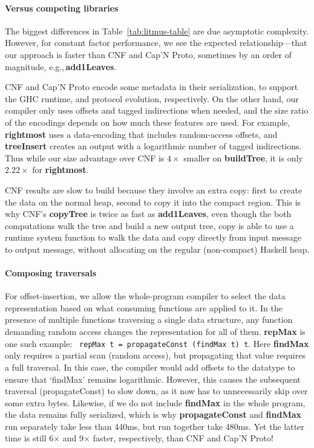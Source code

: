 \documentclass[showabstract,showacknowledgments,showpreface,showdedication,school]{iuphd}
\theoremstyle{nonumberplain}
\newcommand{\eg}{{e.g.,}}
\newcommand{\tabref}[1]{Table~\ref{#1}}
\newcommand{\il}[1]{\lstinline[style=inline,mathescape=true];#1;}
\begin{document}
\paragraph{Versus competing libraries}


The biggest differences in \tabref{tab:litmus-table} are due
asymptotic complexity.
However, for constant factor performance, we see the expected
relationship---that our approach is faster than CNF and Cap'N Proto,
sometimes by an order of magnitude, \eg\,{\bf add1Leaves}.

CNF and Cap'N Proto encode some metadata in their serialization, to
support the GHC runtime, and protocol evolution, respectively.
On the other hand,
our compiler only uses offsets and tagged indirections
when needed, and the size ratio of the encodings depends on how much these features are used.
For example, {\bf rightmost} uses a data-encoding that includes random-access
offsets, and {\bf treeInsert} creates an output with a logarithmic number of
tagged indirections.  Thus while our size advantage over CNF is
$4\times$ smaller
on {\bf buildTree}, it is only
$2.22\times$
for {\bf rightmost}.

CNF results are slow to build because they involve an extra copy: first to
create the data on the normal heap, second to copy it into the compact region.
This is why CNF's {\bf copyTree} is twice as fast as {\bf add1Leaves}, even
though the both computations walk the tree and build a new output tree, copy is
able to use a runtime system function to walk the data and copy directly from
input message to output message, without allocating on the regular (non-compact)
Haskell heap.

\paragraph{Composing traversals}

For offset-insertion, we allow the whole-program compiler to select the data
representation based on what consuming functions are applied to it.
In the presence of multiple functions traversing a single data structure,
any function demanding random access changes the representation for all of them.
{\bf repMax} is one such example:
\il{ repMax t = propagateConst (findMax t) t}.
Here {\bf findMax} only requires a partial scan (random access), but propagating
that value requires a full traversal.  In this case, the compiler would add
offsets to the datatype to ensure that `findMax' remains
logarithmic.
However, this causes the subsequent traversal (propagateConst) to slow
down, as it now has to unnecessarily skip over some extra bytes.  Likewise, if
we do not include {\bf findMax} in the whole program, the data remains fully
serialized, which is why {\bf propagateConst} and {\bf findMax} run separately
take less than 440ms, but run together take 480ms.  Yet the latter time is still
6$\times$ and 9$\times$ faster, respectively, than CNF and Cap'N Proto!
\end{document}
